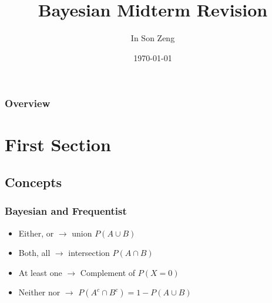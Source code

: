 \documentclass{beamer}
\title[Bayesian Midterm Revision]{Bayesian Midterm Revision} %
\author{In Son Zeng} %
\institute[University of Michigan] %
{
University of Michigan \\ %
\medskip
\textit{insonz@umich.edu} %
}
\date{\today} %
\begin{document}
\begin{frame}
\titlepage %
\end{frame}

\begin{frame}
\frametitle{Overview} %
\tableofcontents %
\end{frame}


\section{First Section} %

\subsection{Concepts} %

\begin{frame}
\frametitle{Bayesian and Frequentist}
\begin{itemize}
\item Either, or $\rightarrow$ union $P(A\cup B)$
\item Both, all $\rightarrow$ intersection $P(A\cap B)$
\item At least one $\rightarrow$ Complement of $P(X=0)$
\item Neither nor $\rightarrow$ $P(A^c \cap B^c) = 1 - P(A\cup B)$ 
\end{itemize}
\end{frame}
\end{document}
